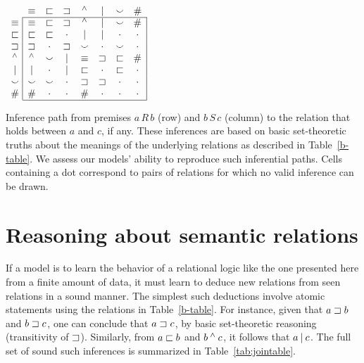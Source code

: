 \begin{table}[htp]
  \centering  \small
  \setlength{\arraycolsep}{8pt}
  \renewcommand{\arraystretch}{1.1}
  \newcommand{\UNK}{\cdot}  
  $\begin{array}[t]{c@{ \ }|*{7}{c}|}
    \multicolumn{1}{c}{}
             & \nateq     & \natfor     & \natrev     & \natneg    & \natalt     & \natcov     & \multicolumn{1}{c}{\natind} \\
    \cline{2-8}
    \nateq  & \nateq &   \natfor &  \natrev &  \natneg &   \natalt &  \natcov &  \natind \\
    \natfor & \natfor &  \natfor &  \UNK &  \natalt &   \natalt &  \UNK &  \UNK \\
    \natrev & \natrev &  \UNK &  \natrev &  \natcov &   \UNK &  \natcov &  \UNK \\
    \natneg & \natneg &  \natcov &  \natalt &  \nateq &    \natrev &  \natfor &  \natind \\
    \natalt & \natalt &  \UNK &  \natalt &  \natfor &   \UNK &  \natfor &  \UNK \\
    \natcov & \natcov &  \natcov &  \UNK &  \natrev &   \natrev &  \UNK &  \UNK \\
    \natind & \natind & \UNK &  \UNK &  \natind &  \UNK &  \UNK &  \UNK \\
    \cline{2-8}
  \end{array}$
  \caption{Inference path from premises $a\,R\,b$ (row) and $b\,S\,c$ (column) to the relation that holds between $a$ and $c$, if any.  These inferences are based on basic set-theoretic truths about the meanings of the underlying relations as described in Table~\ref{b-table}. We assess our models' ability to reproduce such inferential paths. Cells containing a dot correspond to pairs
of relations for which no valid inference can be drawn.}
  \label{tab:jointable}
\end{table}


\section{Reasoning about semantic relations}\label{sec:join}

If a model is to learn the behavior of a relational logic like the one
presented here from a finite amount of data, it must learn to deduce new
relations from seen relations in a sound manner. The simplest such
deductions involve atomic statements using the relations in
Table~\ref{b-table}. For instance, given that $a \sqsupset b$ and $b
\sqsupset c$, one can conclude that $a \sqsupset c$, by basic
set-theoretic reasoning (transitivity of $\sqsupset$). Similarly, from
$a \sqsubset b$ and $b \mathbin{^{\wedge}} c$, it follows that $a \mathbin{|} c$.  The
full set of sound such inferences is summarized in
Table~\ref{tab:jointable}.

